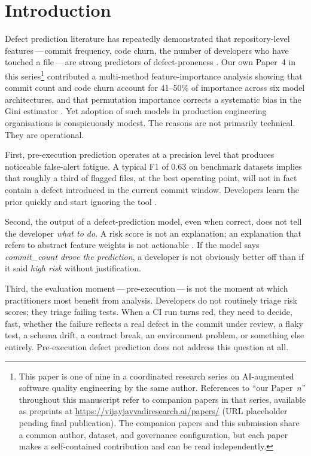\documentclass[conference]{IEEEtran}
\begin{document}
\section{Introduction}
\label{sec:introduction}

Defect prediction literature has repeatedly demonstrated that repository-level features\,---\,commit frequency, code churn, the number of developers who have touched a file\,---\,are strong predictors of defect-proneness \cite{Moser2008,Rahman2013,Nagappan2005,Kamei2013}. Our own Paper~4 in this series\footnote{This paper is one of nine in a coordinated research series on AI-augmented software quality engineering by the same author. References to ``our Paper~$n$'' throughout this manuscript refer to companion papers in that series, available as preprints at \url{https://vijayjavvadiresearch.ai/papers/} (URL placeholder pending final publication). The companion papers and this submission share a common author, dataset, and governance configuration, but each paper makes a self-contained contribution and can be read independently.} contributed a multi-method feature-importance analysis showing that commit count and code churn account for 41--50\% of importance across six model architectures, and that permutation importance corrects a systematic bias in the Gini estimator \cite{Fisher2019}. Yet adoption of such models in production engineering organisations is conspicuously modest. The reasons are not primarily technical. They are operational.

First, pre-execution prediction operates at a precision level that produces noticeable false-alert fatigue. A typical F1 of 0.63 on benchmark datasets implies that roughly a third of flagged files, at the best operating point, will not in fact contain a defect introduced in the current commit window. Developers learn the prior quickly and start ignoring the tool \cite{Tantithamthavorn2017}.

Second, the output of a defect-prediction model, even when correct, does not tell the developer \textit{what to do}. A risk score is not an explanation; an explanation that refers to abstract feature weights is not actionable \cite{Ribeiro2016,Lundberg2017}. If the model says \textit{commit\_count drove the prediction}, a developer is not obviously better off than if it said \textit{high risk} without justification.

Third, the evaluation moment\,---\,pre-execution\,---\,is not the moment at which practitioners most benefit from analysis. Developers do not routinely triage risk scores; they triage failing tests. When a CI run turns red, they need to decide, fast, whether the failure reflects a real defect in the commit under review, a flaky test, a schema drift, a contract break, an environment problem, or something else entirely. Pre-execution defect prediction does not address this question at all.
\end{document}
